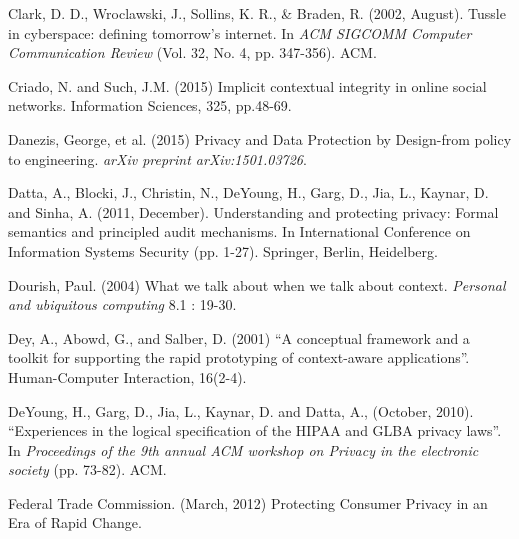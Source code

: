 \documentclass[../thesis.tex]{subfiles}
\begin{document}
\bigskip

\textcolor[rgb]{0.13333334,0.13333334,0.13333334}{Clark, D. D.,
Wroclawski, J., Sollins, K. R., \& Braden, R. (2002, August). Tussle in
cyberspace: defining tomorrow's internet. In
}\textit{\textcolor[rgb]{0.13333334,0.13333334,0.13333334}{ACM SIGCOMM
Computer Communication
Review}}\textcolor[rgb]{0.13333334,0.13333334,0.13333334}{ (Vol. 32,
No. 4, pp. 347-356). ACM.}


\bigskip

Criado, N. and Such, J.M. (2015) Implicit contextual integrity in online
social networks. Information Sciences, 325, pp.48-69.


\bigskip

\textcolor[rgb]{0.13333334,0.13333334,0.13333334}{Danezis, George, et
al. (2015) {\textquotedbl}Privacy and Data Protection by Design-from
policy to engineering.{\textquotedbl}
}\textit{\textcolor[rgb]{0.13333334,0.13333334,0.13333334}{arXiv
preprint
arXiv:1501.03726}}\textcolor[rgb]{0.13333334,0.13333334,0.13333334}{.}


\bigskip

Datta, A., Blocki, J., Christin, N., DeYoung, H., Garg, D., Jia, L.,
Kaynar, D. and Sinha, A. (2011, December). Understanding and protecting
privacy: Formal semantics and principled audit mechanisms. In
International Conference on Information Systems Security (pp. 1-27).
Springer, Berlin, Heidelberg.


\bigskip

Dourish, Paul. (2004) {\textquotedbl}What we talk about when we talk
about context.{\textquotedbl} \textit{Personal and ubiquitous
computing} 8.1 : 19-30.


\bigskip

Dey, A., Abowd, G., and Salber, D. (2001) ``A
conceptual framework and a toolkit for supporting the rapid prototyping
of context-aware applications''. Human-Computer
Interaction, 16(2-4).


\bigskip

\textcolor[rgb]{0.13333334,0.13333334,0.13333334}{DeYoung, H., Garg, D.,
Jia, L., Kaynar, D. and Datta, A., (October, 2010).
``Experiences in the logical specification of the
HIPAA and GLBA privacy laws''. In
}\textit{\textcolor[rgb]{0.13333334,0.13333334,0.13333334}{Proceedings
of the 9th annual ACM workshop on Privacy in the electronic
society}}\textcolor[rgb]{0.13333334,0.13333334,0.13333334}{ (pp.
73-82). ACM.}


\bigskip

Federal Trade Commission. (March, 2012) Protecting Consumer Privacy in
an Era of Rapid Change.
\end{document}
